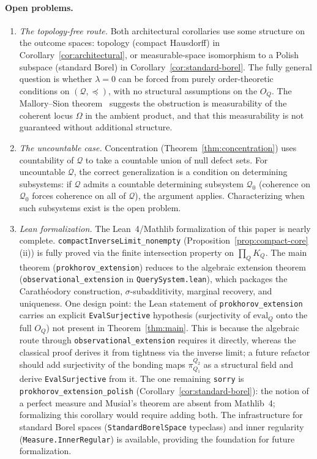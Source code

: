 \documentclass[11pt]{article}
\theoremstyle{definition}
\newcommand{\Qcal}{\mathcal{Q}}
\begin{document}
\paragraph{Open problems.}

\begin{enumerate}
\item \emph{The topology-free route.}
Both architectural corollaries use some structure on the outcome
spaces: topology (compact Hausdorff) in Corollary~\ref{cor:architectural},
or measurable-space isomorphism to a Polish subspace (standard Borel)
in Corollary~\ref{cor:standard-borel}.  The fully general question
is whether $\lambda = 0$ can be forced from purely order-theoretic
conditions on $(\Qcal, \preceq)$, with no structural assumptions
on the $O_Q$.  The Mallory--Sion theorem~\cite{MallorySion1971}
suggests the obstruction is measurability of the coherent locus
$\Omega$ in the ambient product, and that this measurability is not
guaranteed without additional structure.

\item \emph{The uncountable case.}
Concentration (Theorem~\ref{thm:concentration}) uses countability
of $\Qcal$ to take a countable union of null defect sets.  For
uncountable $\Qcal$, the correct generalization is a condition on
determining subsystems: if $\Qcal$ admits a countable determining
subsystem $\Qcal_0$ (coherence on $\Qcal_0$ forces coherence on
all of $\Qcal$), the argument applies.  Characterizing when such
subsystems exist is the open problem.

\item \emph{Lean formalization.}
The Lean~4/Mathlib formalization of this paper is nearly complete.
\texttt{compactInverseLimit\_nonempty} (Proposition~\ref{prop:compact-core}(ii))
is fully proved via the finite intersection property on
$\prod_Q K_Q$.  The main theorem (\texttt{prokhorov\_extension})
reduces to the algebraic extension theorem
(\texttt{observational\_extension} in \texttt{QuerySystem.lean}),
which packages the Carath\'eodory construction, $\sigma$-subadditivity,
marginal recovery, and uniqueness.  One design point: the Lean
statement of \texttt{prokhorov\_extension} carries an explicit
\texttt{EvalSurjective} hypothesis (surjectivity of $\mathrm{eval}_Q$
onto the full $O_Q$) not present in Theorem~\ref{thm:main}.  This
is because the algebraic route through
\texttt{observational\_extension} requires it directly, whereas the
classical proof derives it from tightness via the inverse limit;
a future refactor should add surjectivity of the bonding maps
$\pi^{Q_2}_{Q_1}$ as a structural field and derive
\texttt{EvalSurjective} from it.  The one remaining \texttt{sorry}
is \texttt{prokhorov\_extension\_polish}
(Corollary~\ref{cor:standard-borel}): the notion of a perfect measure
and Musia{\l}'s theorem are absent from Mathlib~4; formalizing this
corollary would require adding both.  The infrastructure for standard
Borel spaces (\texttt{StandardBorelSpace} typeclass) and inner
regularity (\texttt{Measure.InnerRegular}) is available, providing
the foundation for future formalization.
\end{enumerate}
\end{document}
